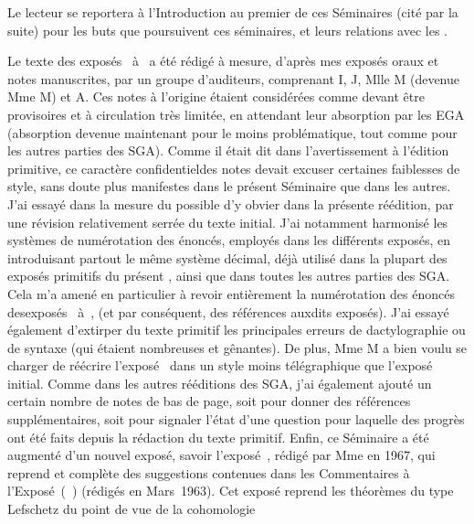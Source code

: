 Le lecteur se reportera \`a l'Introduction au premier de ces S\'eminaires (cit\'e  par la suite) pour les buts que poursuivent ces s\'eminaires, et leurs relations avec les .

Le texte des expos\'es~ \`a~ a \'et\'e r\'edig\'e \`a mesure, d'apr\`es mes expos\'es oraux et notes manuscrites, par un groupe d'auditeurs, comprenant I\ptbl {}, J\ptbl {}, Mlle M\ptbl {} (devenue Mme M\ptbl {}) et A\ptbl {}. Ces notes \`a l'origine \'etaient consid\'er\'ees comme devant \^etre provisoires et \`a circulation tr\`es limit\'ee, en attendant leur absorption par les EGA (absorption devenue maintenant pour le moins probl\'ematique, tout comme pour les autres parties des SGA). Comme il \'etait dit dans l'avertissement \`a l'\'edition primitive, ce caract\`ere \og confidentiel\fg des notes devait excuser certaines \og faiblesses de style\fg, sans doute plus manifestes dans le pr\'esent S\'eminaire  que dans les autres. J'ai essay\'e dans la mesure du possible d'y obvier dans la pr\'esente r\'e\'edition, par une r\'evision relativement serr\'ee du texte initial. J'ai notamment harmonis\'e les syst\`emes de num\'erotation des \'enonc\'es, employ\'es dans les diff\'erents expos\'es, en introduisant partout le m\^eme syst\`eme d\'ecimal, d\'ej\`a utilis\'e dans la plupart des expos\'es primitifs du pr\'esent , ainsi que dans toutes les autres parties des SGA. Cela m'a amen\'e en particulier \`a revoir enti\`erement la num\'erotation des \'enonc\'es des\pageoriginale expos\'es~ \`a~, (et par cons\'equent, des r\'ef\'erences auxdits expos\'es). J'ai essay\'e \'egalement d'extirper du texte primitif les principales erreurs de dactylographie ou de syntaxe (qui \'etaient nombreuses et g\^enantes). De plus, Mme M\ptbl{} a bien voulu se charger de r\'e\'ecrire l'expos\'e~ dans un style moins t\'el\'egraphique que l'expos\'e initial. Comme dans les autres r\'e\'editions des SGA, j'ai \'egalement ajout\'e un certain nombre de notes de bas de page, soit pour donner des r\'ef\'erences suppl\'ementaires, soit pour signaler l'\'etat d'une question pour laquelle des progr\`es ont \'et\'e faits depuis la r\'edaction du texte primitif. Enfin, ce S\'eminaire a \'et\'e augment\'e d'un nouvel expos\'e,  savoir l'expos\'e~, r\'edig\'e par Mme  en 1967, qui reprend et compl\`ete des suggestions contenues dans les \og Commentaires \`a l'Expos\'e~\fg (~) (r\'edig\'es en Mars~1963). Cet expos\'e reprend les th\'eor\`emes du type Lefschetz du point de vue de la cohomologie 